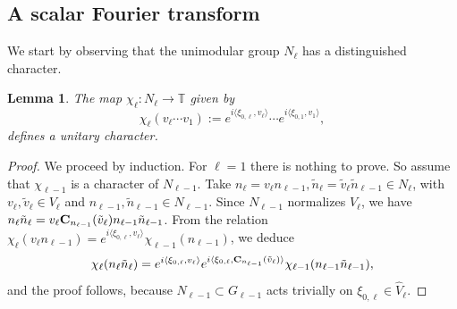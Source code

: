 \documentclass[a4paper,11pt,reqno]{amsart}
\numberwithin{equation}{section}
\newtheorem{lemma}[theorem]{Lemma}
\theoremstyle{remark}
\theoremstyle{definition}
\newcommand\T{{\mathbb T}}
\begin{document}
\subsection{A scalar Fourier transform}
We start by observing that the unimodular group $N_\ell$ has a distinguished character.
\begin{lemma}
\label{Dchi}
The map $\chi_\ell :N_\ell\to \T$ given by
$$
\chi_\ell(v_\ell\cdots v_1):=e^{i\langle \xi_{0,\ell},v_\ell\rangle}\cdots e^{i\langle \xi_{0,1},v_1\rangle},
$$
defines a unitary character.
\end{lemma}
\begin{proof}
We proceed by induction. For $\ell=1$ there is nothing to prove.
So assume that $\chi_{\ell-1}$ is a character of $N_{\ell-1}$.
Take $n_\ell=v_\ell n_{\ell-1},\tilde n_\ell=\tilde v_\ell\tilde  n_{\ell-1}\in N_{\ell}$, with
$v_\ell,\tilde v_\ell\in V_\ell$ and  $n_{\ell-1},\tilde n_{\ell-1}\in N_{\ell-1}$. Since $N_{\ell-1}$ normalizes $V_\ell$,
we have $n_\ell \tilde n_\ell=v_\ell{\bf C}_{n_{\ell-1}}(\tilde  v_\ell)n_{\ell-1}\tilde  n_{\ell-1}$. From the relation
$\chi_\ell(v_\ell n_{\ell-1})=e^{i\langle \xi_{0,\ell},v_\ell\rangle}\chi_{\ell-1}(n_{\ell-1})$,
we deduce
$$
\chi_\ell(n_\ell \tilde  n_\ell)=e^{i\langle \xi_{0,\ell},v_\ell\rangle}e^{i\langle \xi_{0,\ell},{\bf C}_{n_{\ell-1}}(\tilde v_\ell)\rangle}\chi_{\ell-1}(n_{\ell-1}\tilde  n_{\ell-1}),
$$
and the proof follows, because $N_{\ell-1}\subset G_{\ell-1}$ acts trivially on $\xi_{0,\ell}\in\hat V_\ell$.
\end{proof}
\end{document}
